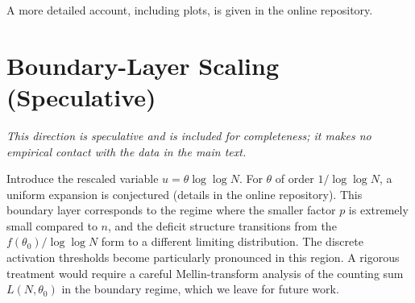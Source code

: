 \documentclass[11pt]{article}
\theoremstyle{definition}
\begin{document}
A more detailed account, including plots, is given in the online repository.

\section{Boundary-Layer Scaling (Speculative)}
\label{app:boundary}

\emph{This direction is speculative and is included for completeness; it makes
no empirical contact with the data in the main text.}

Introduce the rescaled variable \(u = \theta \log\log N\).  For \(\theta\) of order
\(1/\log\log N\), a uniform expansion is conjectured (details in the online
repository).  This boundary layer corresponds to the regime where the smaller factor
\(p\) is extremely small compared to \(n\), and the deficit structure transitions from
the \(f(\theta_0)/\log\log N\) form to a different limiting distribution.  The
discrete activation thresholds become particularly pronounced in this region.  A
rigorous treatment would require a careful Mellin-transform analysis of the counting
sum \(L(N,\theta_0)\) in the boundary regime, which we leave for future work.
\end{document}
